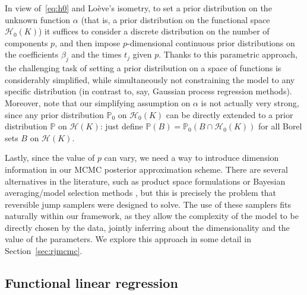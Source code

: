 \documentclass{article}
\numberwithin{equation}{section}
\theoremstyle{plain}
\theoremstyle{definition}
\newcommand{\Hcal}{\mathcal{H}}
\begin{document}
In view of~\eqref{eq:h0} and Loève's isometry, to set a prior distribution on the unknown function \(\alpha\) (that is, a prior distribution on the functional space \(\Hcal_{0}(K)\)) it suffices to consider a discrete distribution on the number of components \(p\), and then impose \(p\)-dimensional continuous prior distributions on the coefficients \(\beta_j\) and the times \(t_j\) given \(p\). Thanks to this parametric approach, the challenging task of setting a prior distribution on a space of functions is considerably simplified, while simultaneously not constraining the model to any specific distribution (in contrast to, say, Gaussian process regression methods). Moreover, note that our simplifying assumption on \(\alpha\) is not actually very strong, since any prior distribution \(\mathbb{P}_0\) on \(\Hcal_0(K)\) can be directly extended to a prior distribution \(\mathbb{P}\) on \(\Hcal(K)\): just define \(\mathbb{P}(B) = \mathbb{P}_0(B\cap \Hcal_0(K))\) for all Borel sets \(B\) on \(\Hcal(K)\).

Lastly, since the value of \(p\) can vary, we need a way to introduce dimension information in our MCMC posterior approximation scheme. There are several alternatives in the literature, such as product space formulations \citep{carlin1995bayesian} or Bayesian averaging/model selection methods \citep{hoeting1999bayesian}, but this is precisely the problem that reversible jump samplers were designed to solve. The use of these samplers fits naturally within our framework, as they allow the complexity of the model to be directly chosen by the data, jointly inferring about the dimensionality and the value of the parameters. We explore this approach in some detail in Section~\ref{sec:rjmcmc}.

\subsection{Functional linear regression}\label{sec:rkhs-linear-model}
\end{document}

